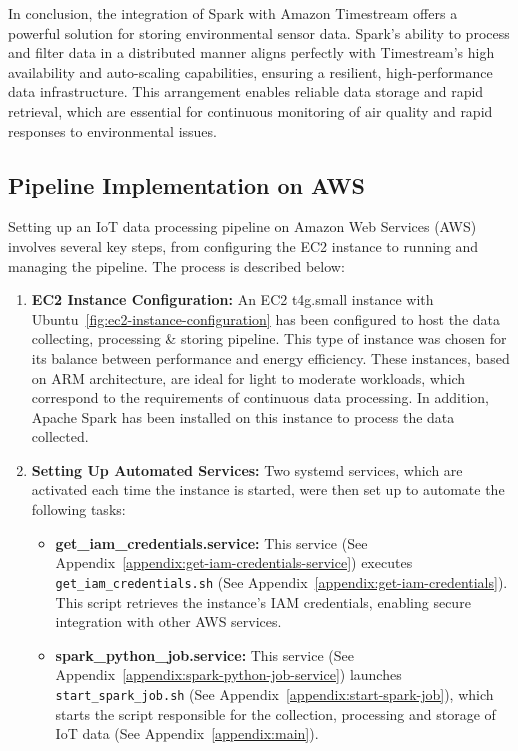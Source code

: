 \documentclass[12pt,oneside]{book} %
\begin{document}
In conclusion, the integration of Spark with Amazon Timestream offers a
powerful solution for storing environmental sensor data. Spark's ability to
process and filter data in a distributed manner aligns perfectly with
Timestream's high availability and auto-scaling capabilities, ensuring a
resilient, high-performance data infrastructure. This arrangement enables
reliable data storage and rapid retrieval, which are essential for continuous
monitoring of air quality and rapid responses to environmental issues.

\newpage
\subsection{Pipeline Implementation on AWS}
Setting up an IoT data processing pipeline on Amazon Web Services (AWS)
involves several key steps, from configuring the EC2 instance to running and
managing the pipeline. The process is described below:

\begin{enumerate}
    \item \textbf{EC2 Instance Configuration:} An EC2 t4g.small instance with Ubuntu~\ref{fig:ec2-instance-configuration} has been configured to host the data collecting, processing \& storing pipeline. This type of instance was chosen for its balance between performance and energy efficiency. These instances, based on ARM architecture, are ideal for light to moderate workloads, which correspond to the requirements of continuous data processing. In addition, Apache Spark has been installed on this instance to process the data collected.
    \item \textbf{Setting Up Automated Services:} Two systemd services, which are activated each time the instance is started, were then set up to automate the following tasks:
          \begin{itemize}
              \item \textbf{get\_iam\_credentials.service:} This service (See Appendix~\ref{appendix:get-iam-credentials-service}) executes \texttt{get\_iam\_credentials.sh} (See Appendix~\ref{appendix:get-iam-credentials}). This script retrieves the instance's IAM credentials, enabling secure integration with other AWS services.
              \item \textbf{spark\_python\_job.service:} This service (See Appendix~\ref{appendix:spark-python-job-service}) launches \texttt{start\_spark\_job.sh} (See Appendix~\ref{appendix:start-spark-job}), which starts the script responsible for the collection, processing and storage of IoT data (See Appendix~\ref{appendix:main}).
          \end{itemize}
\end{enumerate}
\end{document}
